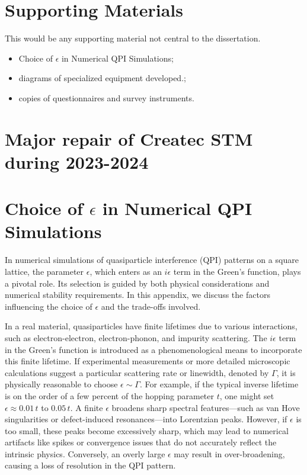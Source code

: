 \chapter{Supporting Materials}

This would be any supporting material not central to the dissertation.

\begin{itemize}
\item Choice of $\epsilon$ in Numerical QPI Simulations;
\item diagrams of specialized equipment developed.;
\item copies of questionnaires and survey instruments.
\end{itemize}

\chapter{Major repair of Createc STM during 2023-2024}

\chapter{Choice of $\epsilon$ in Numerical QPI Simulations}
\label{app:epsilon}

In numerical simulations of quasiparticle interference (QPI) patterns on a square lattice, the parameter $\epsilon$, which enters as an $i\epsilon$ term in the Green's function, plays a pivotal role. Its selection is guided by both physical considerations and numerical stability requirements. In this appendix, we discuss the factors influencing the choice of $\epsilon$ and the trade-offs involved.

In a real material, quasiparticles have finite lifetimes due to various interactions, such as electron-electron, electron-phonon, and impurity scattering. The $i\epsilon$ term in the Green’s function is introduced as a phenomenological means to incorporate this finite lifetime. If experimental measurements or more detailed microscopic calculations suggest a particular scattering rate or linewidth, denoted by $\Gamma$, it is physically reasonable to choose $\epsilon \sim \Gamma$. For example, if the typical inverse lifetime is on the order of a few percent of the hopping parameter $t$, one might set $\epsilon \approx 0.01\,t$ to $0.05\,t$. A finite $\epsilon$ broadens sharp spectral features—such as van Hove singularities or defect-induced resonances—into Lorentzian peaks. However, if $\epsilon$ is too small, these peaks become excessively sharp, which may lead to numerical artifacts like spikes or convergence issues that do not accurately reflect the intrinsic physics. Conversely, an overly large $\epsilon$ may result in over-broadening, causing a loss of resolution in the QPI pattern.

